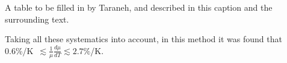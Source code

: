 \begin{table}
\caption{A table to be filled in by Taraneh, and described in this
  caption and the surrounding text.}
\label{tab:axialsummary}
\end{table}



Taking all these systematics into account, in this method it was found
that 0.6\%/K~$\lesssim\frac{1}{\mu}\frac{d\mu}{dT}\lesssim 2.7\%$/K.




